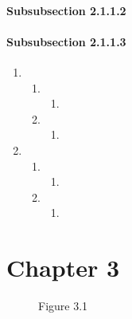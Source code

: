 \documentclass{book}
\begin{document}

\subsubsection{Subsubsection 2.1.1.2}
\label{sec:subs-2.1.1.2}

\subsubsection{Subsubsection 2.1.1.3}
\label{sec:subs-2.1.1.3}

\begin{enumerate}
\item {}
  \begin{enumerate}
  \item {}
    \begin{enumerate}
    \item {}
    \end{enumerate}
  \item {}
    \begin{enumerate}
    \item {}
    \end{enumerate}
  \end{enumerate}
\item {}
  \begin{enumerate}
  \item {}
    \begin{enumerate}
    \item {}
    \end{enumerate}
  \item {}
    \begin{enumerate}
    \item {}
    \end{enumerate}
  \end{enumerate}
\end{enumerate}

\chapter{Chapter 3}
\label{cha:chapter-3}



\begin{figure}
  \centering

  \caption{Figure 3.1}
  \label{fig:figure-3-1}
\end{figure}
\end{document}
